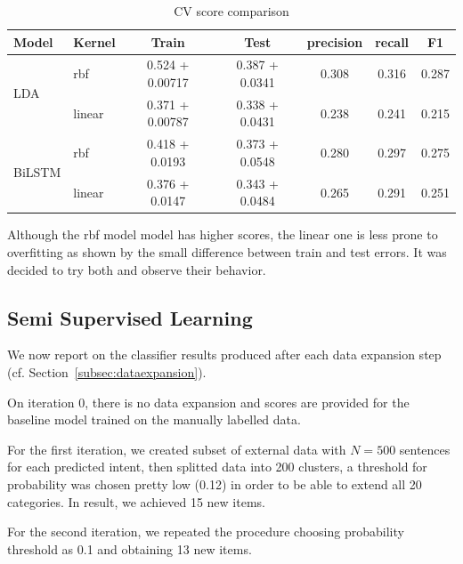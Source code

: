 \documentclass[11pt]{article}
\begin{document}

\begin{table}[htb]
\begin{center}
\begin{tabular}{ |p{1.5cm}|p{1cm}|c|c|c|c|c| }
\hline
Model 	& Kernel 	& Train & Test & precision & recall & F1 \\ \hline
\multirow{2}{*}{LDA} &	rbf		& 0.524 + 0.00717 & 0.387 + 0.0341 & 0.308 & 0.316 & 0.287 \\ 
& linear	& 0.371 + 0.00787 & 0.338 + 0.0431 & 0.238 & 0.241 & 0.215 \\ \hline
\multirow{2}{*}{BiLSTM}&	rbf		& 0.418 + 0.0193 & 0.373 + 0.0548 & 0.280 & 0.297 & 0.275 \\ 
& linear	& 0.376 + 0.0147 & 0.343 + 0.0484 & 0.265 & 0.291 & 0.251 \\ \hline
\end{tabular}
\caption{CV score comparison} \label{tab:classificationresults}
\end{center}
\end{table}
\FloatBarrier

Although the rbf model model has higher scores, the linear one is less prone to overfitting as shown by the small difference between train and test errors. It was decided to try both and observe their behavior.


\subsection{Semi Supervised Learning}
\label{subsec:semisupervised}

We now report on the classifier results produced after each data
expansion step (cf. Section~\ref{subsec:dataexpansion}).
 
On iteration 0, there is no data expansion and scores are provided for
the baseline model trained on the manually labelled data.


For the first iteration, we created subset of external data with
$N=500$ sentences for each predicted intent, then splitted data into
200 clusters, a threshold for probability was chosen
pretty low (0.12) in order to be able to extend all 20 categories. In
result, we achieved 15 new items.

For the second iteration, we repeated the procedure choosing
probability threshold as 0.1 and obtaining 13 new items.
\end{document}
